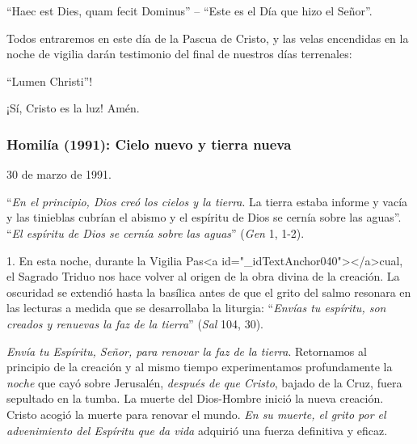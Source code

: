 			\begin{body}“Haec est Dies, quam fecit Dominus” – “Este es el Día que hizo el Señor”. \end{body}
			
			\begin{body}Todos entraremos en este día de la Pascua de Cristo, y las velas encendidas en la noche de vigilia darán testimonio del final de nuestros días terrenales: \end{body}
			
			\begin{body}“Lumen Christi”! \end{body}
			
			\begin{body}¡Sí, Cristo es la luz! Amén.\end{body}
			
			\subsubsection{Homilía (1991): Cielo nuevo y tierra nueva}
			
			\begin{referencia}30 de marzo de 1991.\end{referencia}
			
			\begin{body}“\textit{En el principio, Dios creó los cielos y la tierra}. La tierra estaba informe y vacía y las tinieblas cubrían el abismo y el espíritu de Dios se cernía sobre las aguas”. “\textit{El espíritu de Dios se cernía sobre las aguas}” (\textit{Gen} 1, 1-2). \end{body}
			
			\begin{body}1. En esta noche, durante la Vigilia Pas<a id="_idTextAnchor040"></a>cual, el Sagrado Triduo nos hace volver al origen de la obra divina de la creación. La oscuridad se extendió hasta la basílica antes de que el grito del salmo resonara en las lecturas a medida que se desarrollaba la liturgia: “\textit{Envías tu espíritu, son creados y renuevas la faz de la tierra}” (\textit{Sal} 104, 30). \end{body}
			
			\begin{body}\textit{Envía tu Espíritu, Señor, para renovar la faz de la tierra}. Retornamos al principio de la creación y al mismo tiempo experimentamos profundamente la \textit{noche }que cayó sobre Jerusalén, \textit{después de que Cristo}, bajado de la Cruz, fuera sepultado en la tumba. La muerte del Dios-Hombre inició la nueva creación. Cristo acogió la muerte para renovar el mundo. \textit{En su muerte, el grito por el advenimiento del Espíritu que da vida} adquirió una fuerza definitiva y eficaz. \end{body}
			

